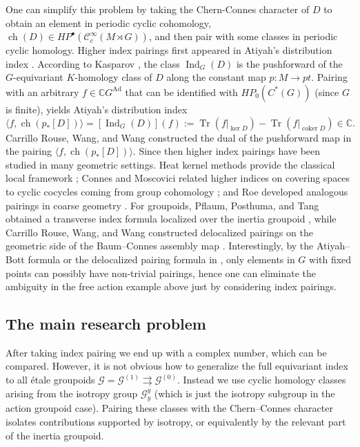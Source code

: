 \documentclass[a4paper]{amsart}
\newcommand{\Ind}{\operatorname{Ind}}
\newcommand{\ch}{\operatorname{ch}}
\newcommand{\Ad}{\operatorname{Ad}}
\newcommand{\maC}{\mathcal C}
\newcommand{\maG}{\mathcal G}
\newcommand\<{\langle}
\renewcommand\>{\rangle}
\theoremstyle{definition}
\theoremstyle{remark}
\begin{document}
One can simplify this problem by taking the Chern-Connes character of $D$ to obtain an element in periodic cyclic cohomology,
$\ch (D) \in H P ^\bullet (\maC ^\infty _c (M \rtimes G))$, and then pair with some classes in periodic cyclic homology.
Higher index pairings first appeared in Atiyah's distribution index \cite{AtiyahBook74}.
According to Kasparov \cite{Kasparov16},
the class $\Ind_G(D)$ is the pushforward of the $G$-equivariant $K$-homology class
of $D$ along the constant map $p: M \to pt$.
Pairing with an arbitrary $f \in \mathbb{C}G ^{\Ad {}}$
that can be identified with $H P _0 (C^* (G))$ (since $G$ is finite),
yields Atiyah's distribution index \cite{AtiyahBook74}
$$\langle f , \ch (p _* [D]) \rangle = [\Ind _G(D)](f) := \operatorname{Tr}(f|_{\ker D})
- \operatorname{Tr}(f|_{\operatorname{coker}D}) \in \mathbb{C}.$$
Carrillo Rouse, Wang, and Wang \cite{CRWW23} constructed the dual of the pushforward map
in the pairing $\langle f , \ch (p _* [D]) \rangle$.
Since then higher index pairings have been studied in many geometric settings.
Heat kernel methods provide the classical local framework \cite{BGVBook04};
Connes and Moscovici related higher indices on covering spaces to cyclic cocycles
coming from group cohomology \cite{CM90}; and Roe developed analogous pairings
in coarse geometry \cite{Roe93}.
For groupoids, Pflaum, Posthuma, and Tang obtained a transverse index formula
localized over the inertia groupoid \cite{PPT15}, while Carrillo Rouse, Wang,
and Wang constructed delocalized pairings on the geometric side of the Baum--Connes assembly map \cite{CRWW23}.
Interestingly, by the Atiyah--Bott formula or the delocalized pairing formula in \cite{CRWW23},
only elements in $G$ with fixed points can possibly have non-trivial pairings,
hence one can eliminate the ambiguity in the free action example above just by considering index pairings.


\subsection{The main research problem}
After taking index pairing we end up with a complex number, which can be compared.
However, it is not obvious how to generalize the full equivariant index to all \'etale groupoids
$\maG = \maG ^{(1)} \rightrightarrows \maG ^{(0)}$.
Instead we use cyclic homology classes arising from the isotropy group $\maG_y^y$
(which is just the isotropy subgroup in the action groupoid case).
Pairing these classes with the Chern--Connes character isolates contributions supported by isotropy,
or equivalently by the relevant part of the inertia groupoid.
\end{document}
